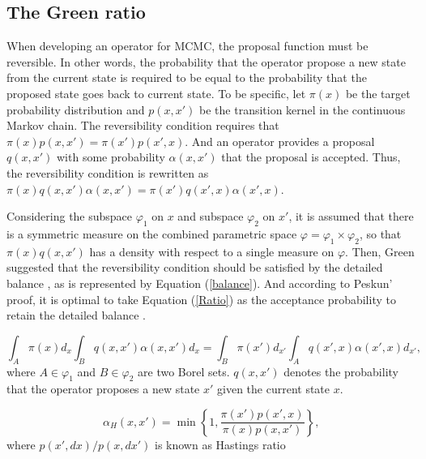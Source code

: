 \documentclass{bmcart}
\begin{document}
\begin{backmatter}
\subsection{The Green ratio}
When developing an operator for MCMC, the proposal function must be reversible. In other words, the probability that the operator propose a new state from the current state is required to be equal to the probability that the proposed state goes back to current state. To be specific, let ${\pi (x)}$ be the target probability distribution and $p(x, x')$ be the transition kernel in the continuous Markov chain. The reversibility condition requires that ${\pi (x)}{p(x, x')} = {\pi (x')}{p(x', x)}$. And an operator provides a proposal $q(x, x')$ with some probability $\alpha(x, x')$ that the proposal is accepted. Thus, the reversibility condition is rewritten as ${\pi (x)}{q(x, x')}{\alpha(x, x')} = {\pi (x')}{q(x', x)}{\alpha(x', x)}$.

Considering the subspace $\varphi_1$ on $x$ and subspace $\varphi_2$ on $x'$, it is assumed that there is a symmetric measure on the combined parametric space $\varphi = {\varphi_1} \times {\varphi_2}$, so that ${\pi (x)}{q(x, x')}$ has a density with respect to a single measure on $\varphi$. Then, Green suggested that the reversibility condition should be satisfied by the detailed balance \cite{green1995reversible}, as is represented by Equation (\ref{balance}). And according to Peskun' proof, it is optimal to take Equation (\ref{Ratio}) as the acceptance probability to retain the detailed balance \cite{peskun1973optimum}.

\begin{equation}\label{balance}
\int_A {\pi (x) d_x} {\int_B  {q(x, x')}{\alpha(x, x')} d_x}  = \int_B {\pi (x') d_{x'}}{\int_A {q(x', x)}{\alpha(x', x)} d_{x'}} \text{,}
\end{equation}
where $A \in {\varphi_1}$ and $B \in  {\varphi_2}$ are two Borel sets. ${q(x, x')}$ denotes the probability that the operator proposes a new state $x'$ given the current state $x$.

\begin{equation}\label{Ratio}
{\alpha_H}(x, x') = \min \left\{ {1,\frac{{\pi (x'){p}(x',x)}}{{\pi (x){p}(x,x')}}} \right\} \text{,}
\end{equation}
where ${p(x',dx)}/{p(x,dx')}$ is known as Hastings ratio


\end{backmatter}
\end{document}
